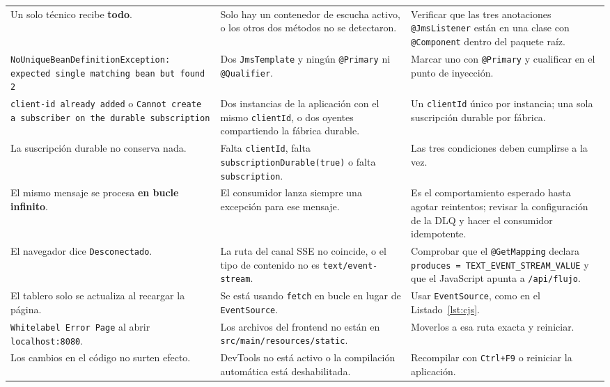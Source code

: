 \documentclass[11pt,a4paper]{book}
\newcommand{\clase}[1]{\texttt{#1}}
\newcommand{\ruta}[1]{\texttt{#1}}
\begin{document}
\begin{center}
\begin{xltabular}{\textwidth}{@{}>{\raggedright\arraybackslash}p{4.6cm}>{\raggedright\arraybackslash}X>{\raggedright\arraybackslash}X@{}}
		Un solo técnico recibe \textbf{todo}. &
		Solo hay un contenedor de escucha activo, o los otros dos métodos no se detectaron. &
		Verificar que las tres anotaciones \texttt{@JmsListener} están en una clase con \texttt{@Component} dentro del paquete raíz. \\

		\texttt{NoUnique\allowbreak{}Bean\allowbreak{}Definition\allowbreak{}Exception: expected single matching bean but found 2} &
		Dos \clase{JmsTemplate} y ningún \texttt{@Primary} ni \texttt{@Qualifier}. &
		Marcar uno con \texttt{@Primary} y cualificar en el punto de inyección. \\

		\texttt{client-id already added} o \texttt{Cannot create a subscriber on the durable subscription} &
		Dos instancias de la aplicación con el mismo \texttt{clientId}, o dos oyentes compartiendo la fábrica durable. &
		Un \texttt{clientId} único por instancia; una sola suscripción durable por fábrica. \\

		La suscripción durable no conserva nada. &
		Falta \texttt{clientId}, falta \texttt{subscriptionDurable(true)} o falta \texttt{subscription}. &
		Las tres condiciones deben cumplirse a la vez. \\

		El mismo mensaje se procesa \textbf{en bucle infinito}. &
		El consumidor lanza siempre una excepción para ese mensaje. &
		Es el comportamiento esperado hasta agotar reintentos; revisar la configuración de la DLQ y hacer el consumidor idempotente. \\

		El navegador dice \texttt{Desconectado}. &
		La ruta del canal SSE no coincide, o el tipo de contenido no es \texttt{text/event-stream}. &
		Comprobar que el \texttt{@GetMapping} declara \texttt{produces = TEXT\_EVENT\_STREAM\_VALUE} y que el JavaScript apunta a \texttt{/api/flujo}. \\

		El tablero solo se actualiza al recargar la página. &
		Se está usando \texttt{fetch} en bucle en lugar de \texttt{EventSource}. &
		Usar \texttt{EventSource}, como en el Listado~\ref{lst:cjs}. \\

		\texttt{Whitelabel Error Page} al abrir \texttt{localhost:8080}. &
		Los archivos del frontend no están en \ruta{src/main/resources/static}. &
		Moverlos a esa ruta exacta y reiniciar. \\

		Los cambios en el código no surten efecto. &
		DevTools no está activo o la compilación automática está deshabilitada. &
		Recompilar con \texttt{Ctrl+F9} o reiniciar la aplicación. \\

	\end{xltabular}
\end{center}
\end{document}
